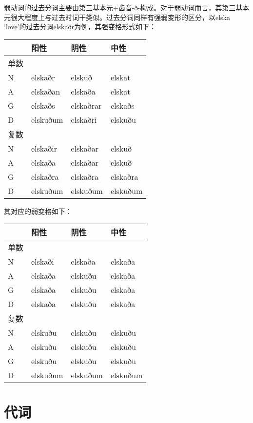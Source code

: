 弱动词的过去分词主要由第三基本元+齿音-ð-构成。对于弱动词而言，其第三基本元很大程度上与过去时词干类似。过去分词同样有强弱变形的区分，以elska
`love‌'的过去分词elskaðr为例，其强变格形式如下：

\begin{longtable}{llll}
  \toprule
       & 阳性     & 阴性      & 中性     \\
  \midrule
  \endhead
  \bottomrule
  \endfoot
  单数 &          &           &          \\
  N    & elskaðr  & elskuð    & elskat   \\
  A    & elskaðan & elskaða   & elskat   \\
  G    & elskaðs  & elskaðrar & elskaðs  \\
  D    & elskuðum & elskaðri  & elskuðu  \\
  复数 &          &           &          \\
  N    & elskaðir & elskaðar  & elskuð   \\
  A    & elskaða  & elskaðar  & elskuð   \\
  G    & elskaðra & elskaðra  & elskaðra \\
  D    & elskuðum & elskuðum  & elskuðum \\
\end{longtable}

其对应的弱变格如下：

\begin{longtable}{llll}
  \toprule
       & 阳性     & 阴性     & 中性     \\
  \midrule
  \endhead
  \bottomrule
  \endfoot
  单数 &          &          &          \\
  N    & elskaði  & elskaða  & elskaða  \\
  A    & elskaða  & elskuðu  & elskaða  \\
  G    & elskaða  & elskuðu  & elskaða  \\
  D    & elskaða  & elskuðu  & elskaða  \\
  复数 &          &          &          \\
  N    & elskuðu  & elskuðu  & elskuðu  \\
  A    & elskuðu  & elskuðu  & elskuðu  \\
  G    & elskuðu  & elskuðu  & elskuðu  \\
  D    & elskuðum & elskuðum & elskuðum \\
\end{longtable}

\chapter{代词}\label{代词}

